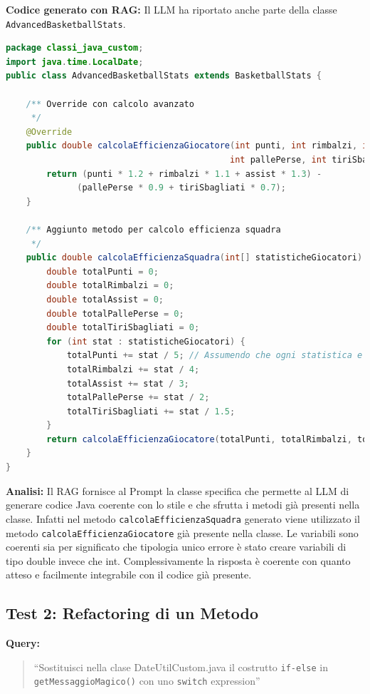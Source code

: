 \documentclass[12pt,a4paper,openright,twoside]{book}
\begin{document}
\textbf{Codice generato con RAG:}
Il LLM ha riportato anche parte della classe \texttt{AdvancedBasketballStats}. 
\begin{lstlisting}[language=Java]
package classi_java_custom;
import java.time.LocalDate;
public class AdvancedBasketballStats extends BasketballStats {

    /** Override con calcolo avanzato
     */
    @Override
    public double calcolaEfficienzaGiocatore(int punti, int rimbalzi, int assist,
                                            int pallePerse, int tiriSbagliati) {
        return (punti * 1.2 + rimbalzi * 1.1 + assist * 1.3) -
              (pallePerse * 0.9 + tiriSbagliati * 0.7);
    }

    /** Aggiunto metodo per calcolo efficienza squadra
     */
    public double calcolaEfficienzaSquadra(int[] statisticheGiocatori) {
        double totalPunti = 0;
        double totalRimbalzi = 0;
        double totalAssist = 0;
        double totalPallePerse = 0;
        double totalTiriSbagliati = 0;
        for (int stat : statisticheGiocatori) {
            totalPunti += stat / 5; // Assumendo che ogni statistica e' un punto, rimbalzo, assist, palle perse o tiri sbagliati
            totalRimbalzi += stat / 4;
            totalAssist += stat / 3;
            totalPallePerse += stat / 2;
            totalTiriSbagliati += stat / 1.5;
        }
        return calcolaEfficienzaGiocatore(totalPunti, totalRimbalzi, totalAssist, totalPallePerse, totalTiriSbagliati);
    }
}
\end{lstlisting}
\textbf{Analisi:}
Il RAG fornisce al Prompt la classe specifica che permette al LLM di generare codice Java coerente con lo stile e che sfrutta i metodi già presenti nella classe.
Infatti nel metodo \texttt{calcolaEfficienzaSquadra} generato viene utilizzato il metodo \texttt{calcolaEfficienzaGiocatore} già presente nella classe.
Le variabili sono coerenti sia per significato che tipologia unico errore è stato creare variabili di tipo double invece che int.
Complessivamente la risposta è coerente con quanto atteso e facilmente integrabile con il codice già presente.
\subsection{Test 2: Refactoring di un Metodo}
\textbf{Query:} 
\begin{quote}
``Sostituisci nella clase DateUtilCustom.java il costrutto \texttt{if-else} in \texttt{getMessaggioMagico()} con uno \texttt{switch} expression''
\end{quote}
\end{document}
